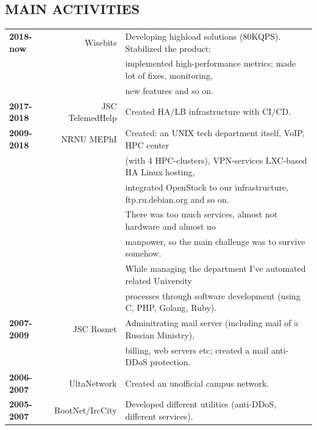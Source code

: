 \begin{resume}
\section{MAIN ACTIVITIES}
\vspace{0.1in} 
\begin{tabular}{lrl}
    {\bf 2018-now}  & Wisebits        & Developing highload solutions (80KQPS). Stabilized the product;\\
                    &                 & implemented high-performance metrics; made lot of fixes, monitoring,\\
                    &                 & new features and so on.\\
    {\bf 2017-2018} & JSC TelemedHelp & Created HA/LB infrastructure with CI/CD.\\
    {\bf 2009-2018} & NRNU MEPhI      & Created: an UNIX tech department itself, VoIP, HPC center\\
                    &                 & (with 4 HPC-clusters), VPN-services LXC-based HA Linux hosting,\\
                    &                 & integrated OpenStack to our infrastructure, ftp.ru.debian.org and so on.\\
                    &                 & There was too much services, almost not hardware and almost no\\
                    &                 & manpower, so the main challenge was to survive somehow.\\
                    &                 & While managing the department I've automated related University\\
                    &                 & processes through software development (using C, PHP, Golang, Ruby).\\
    {\bf 2007-2009} & JSC Rosnet      & Adminitrating mail server (including mail of a Russian Ministry),\\
                    &                 & billing, web servers etc; created a mail anti-DDoS protection.\\
    {\bf 2006-2007} & UltaNetwork     & Created an unofficial campus network.\\
    {\bf 2005-2007} & RootNet/IrcCity & Developed different utilities (anti-DDoS, different services).\\
\end{tabular}


\end{resume}
